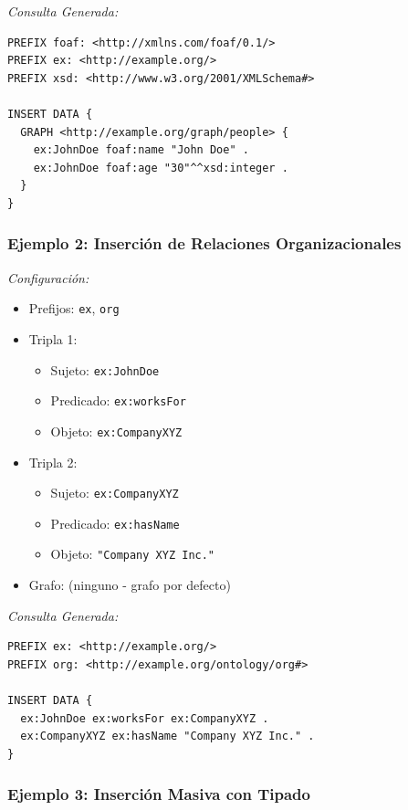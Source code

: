 \documentclass{article}
\begin{document}
\textit{Consulta Generada:}
\begin{verbatim}
PREFIX foaf: <http://xmlns.com/foaf/0.1/>
PREFIX ex: <http://example.org/>
PREFIX xsd: <http://www.w3.org/2001/XMLSchema#>

INSERT DATA {
  GRAPH <http://example.org/graph/people> {
    ex:JohnDoe foaf:name "John Doe" .
    ex:JohnDoe foaf:age "30"^^xsd:integer .
  }
}
\end{verbatim}

\subsubsection{Ejemplo 2: Inserción de Relaciones Organizacionales}
\label{subsubsec:example-organization}

\textit{Configuración:}
\begin{itemize}
    \item Prefijos: \texttt{ex}, \texttt{org}
    \item Tripla 1:
    \begin{itemize}
        \item Sujeto: \texttt{ex:JohnDoe}
        \item Predicado: \texttt{ex:worksFor}
        \item Objeto: \texttt{ex:CompanyXYZ}
    \end{itemize}
    \item Tripla 2:
    \begin{itemize}
        \item Sujeto: \texttt{ex:CompanyXYZ}
        \item Predicado: \texttt{ex:hasName}
        \item Objeto: \texttt{"Company XYZ Inc."}
    \end{itemize}
    \item Grafo: (ninguno - grafo por defecto)
\end{itemize}

\textit{Consulta Generada:}
\begin{verbatim}
PREFIX ex: <http://example.org/>
PREFIX org: <http://example.org/ontology/org#>

INSERT DATA {
  ex:JohnDoe ex:worksFor ex:CompanyXYZ .
  ex:CompanyXYZ ex:hasName "Company XYZ Inc." .
}
\end{verbatim}

\subsubsection{Ejemplo 3: Inserción Masiva con Tipado}
\label{subsubsec:example-bulk}
\end{document}
